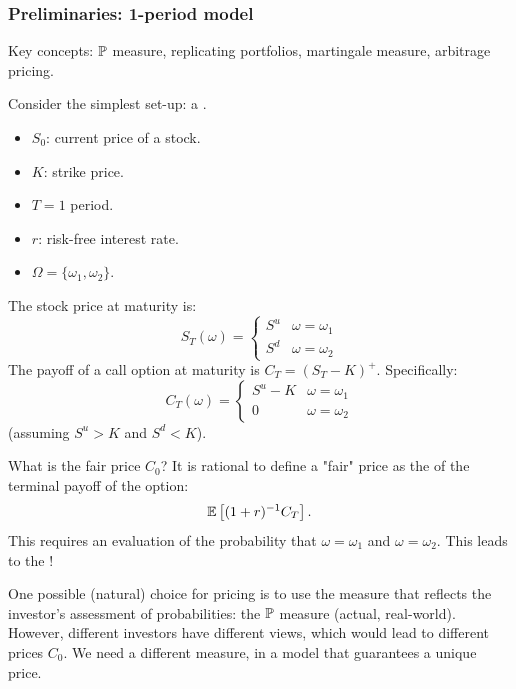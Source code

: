 \subsubsection{Preliminaries: 1-period model}

\begin{remark}
    Key concepts: $\mathbb P$ measure, replicating portfolios, martingale measure, arbitrage pricing.
    
    Consider the simplest set-up: a .
    \begin{itemize}
        \item $S_0$: current price of a stock.
        \item $K$: strike price.
        \item $T = 1$ period.
        \item $r$: risk-free interest rate.
        \item $\Omega = \{\omega_1, \omega_2\}$.
    \end{itemize}
    The stock price at maturity is:
    \[ S_T(\omega) = \begin{cases} S^u & \omega = \omega_1 \\ S^d & \omega = \omega_2 \end{cases} \]
    The payoff of a call option at maturity is $C_T = (S_T - K)^+$. Specifically:
    \[ C_T(\omega) = \begin{cases} S^u - K & \omega = \omega_1 \\ 0 & \omega = \omega_2 \end{cases} \]
    (assuming $S^u > K$ and $S^d < K$).
    
    What is the fair price $C_0$? It is rational to define a "fair" price as the  of the terminal payoff of the option:
    \[ \mathbb E \left[ (1+r)^{-1} C_T \right]. \]
    This requires an evaluation of the probability that $\omega = \omega_1$ and $\omega = \omega_2$. This leads to the !
\end{remark}

\begin{remark}
    One possible (natural) choice for pricing is to use the measure that reflects the investor's assessment of probabilities: the  $\mathbb P$ measure (actual, real-world).
    However, different investors have different views, which would lead to different prices $C_0$. We need a different measure, in a model that guarantees a unique price.
\end{remark}

